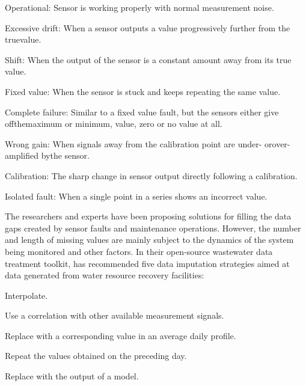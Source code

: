 \noindent
\begin{myenumerate}
    \item Operational: Sensor is working properly with normal measurement noise.
    \item Excessive drift: When a sensor outputs a value progressively further from the truevalue.
    \item Shift: When the output of the sensor is a constant amount away from its true value.
    \item Fixed value: When the sensor is stuck and keeps repeating the same value.
    \item Complete failure: Similar to a fixed value fault, but the sensors either give offthemaximum or minimum, value, zero or no value at all.
    \item Wrong gain: When signals away from the calibration point are under- orover-amplified bythe sensor.
    \item Calibration: The sharp change in sensor output directly following a calibration.
    \item Isolated fault: When a single point in a series shows an incorrect value.
\end{myenumerate}

The researchers and experts have been proposing solutions for filling the data gaps created by sensor faults and maintenance operations. However, the number and length of missing values are mainly subject to the dynamics of the system being monitored and other factors. In their open-source wastewater data treatment toolkit,\citet{demulderOpenSoftwarePackage2018} has recommended five data imputation strategies aimed at data generated from water resource recovery facilities:

\noindent
\begin{myenumerate}
    \item Interpolate.
    \item Use a correlation with other available measurement signals.
    \item Replace with a corresponding value in an average daily profile.
    \item Repeat the values obtained on the preceding day.
    \item Replace with the output of a model. 
\end{myenumerate}

